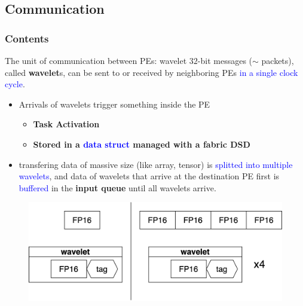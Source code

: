 \documentclass[dvipdfmx, 11pt, aspectratio=169]{beamer}   %
\begin{document}
\subsection{Communication}
\begin{frame}
    \frametitle{Contents}
    \tableofcontents[currentsubsection]
\end{frame}
\begin{frame}{The unit of communication between PEs: wavelet}
$32$-bit messages ($\sim$ packets), called \textbf{wavelet}s, can be sent to or received by neighboring PEs \textcolor{blue}{in a single clock cycle}.
\begin{itemize}
    \item Arrivals of wavelets trigger something inside the PE
    \begin{itemize}
        \item \textbf{Task Activation}
        \item \textbf{Stored in a \textcolor{blue}{data struct} managed with a fabric DSD}
    \end{itemize}
    \item transfering data of massive size (like array, tensor) is \textcolor{blue}{splitted into multiple wavelets}, 
        and data of wavelets that arrive at the destination PE first is \textcolor{blue}{buffered} in the \textbf{input queue} until all wavelets arrive.
\end{itemize}
\begin{figure}
    \includegraphics[scale=0.08]{img/wavelet.png}
\end{figure}
\end{frame}
\end{document}
